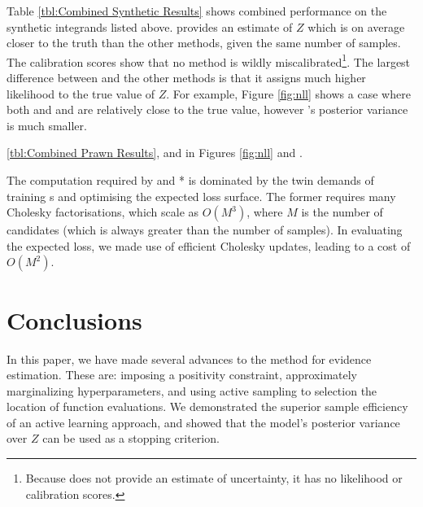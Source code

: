 \documentclass{article}
\begin{document}
Table \ref{tbl:Combined Synthetic Results} shows combined performance on the synthetic integrands listed above.  provides an estimate of $Z$ which is on average closer to the truth than the other methods, given the same number of samples. The calibration scores show that no method is wildly miscalibrated\footnote{Because  does not provide an estimate of uncertainty, it has no likelihood or calibration scores.}.  The largest difference between  and the other methods is that it assigns much higher likelihood to the true value of $Z$.  For example, Figure \ref{fig:nll} shows a case where both and  and  are relatively close to the true value, however 's posterior variance is much smaller.

\ref{tbl:Combined Prawn Results}, and in Figures \ref{fig:nll} and .

The computation required by  and * is dominated by the twin demands of training \gp s and optimising the expected loss surface. The former requires many Cholesky factorisations, which scale as $O(M^3)$, where $M$ is the number of candidates (which is always greater than the number of samples). In evaluating the expected loss, we made use of efficient Cholesky updates, leading to a cost of $O(M^2)$.

\section{Conclusions}

 In this paper, we have made several advances to the  method for evidence estimation.  These are: imposing a positivity constraint, approximately marginalizing hyperparameters, and using active sampling to selection the location of function evaluations.  We demonstrated the superior sample efficiency of an active learning approach, and showed that the model's posterior variance over $Z$ can be used as a stopping criterion.


\end{document}
